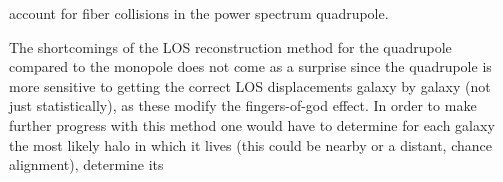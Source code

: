                                                                                                                                                                                                                                                                          account for fiber collisions in the power spectrum quadrupole. 

                                                                                                                                                                                                                                                                         The shortcomings of the LOS reconstruction method for the quadrupole compared 
                                                                                                                                                                                                                                                                         to the monopole does not come as a surprise since the quadrupole is more 
                                                                                                                                                                                                                                                                         sensitive to getting the correct LOS displacements galaxy by galaxy 
                                                                                                                                                                                                                                                                         (not just statistically), as these modify the fingers-of-god effect. 
                                                                                                                                                                                                                                                                         In order to make further progress with this method one would have to 
                                                                                                                                                                                                                                                                         determine for each galaxy the most likely halo in which it lives 
                                                                                                                                                                                                                                                                         (this could be nearby or a distant, chance alignment), determine its 
